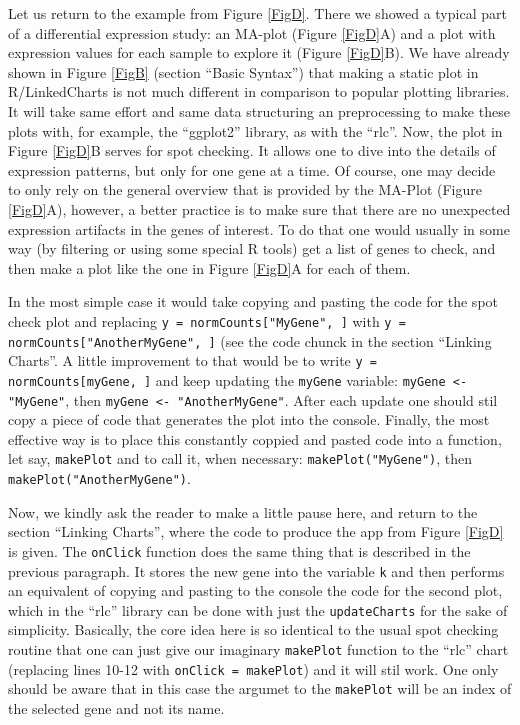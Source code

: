 \documentclass[twocolumn,10pt]{article}
\begin{document}
Let us return to the example from Figure \ref{FigD}. There we showed a typical part of a differential expression study: an MA-plot (Figure \ref{FigD}A) and a plot with expression values for each sample to explore it (Figure \ref{FigD}B). We have already shown in Figure \ref{FigB} (section ``Basic Syntax'') that making a static plot in R/LinkedCharts is not much different in comparison to popular plotting libraries. It will take same effort and same data structuring an preprocessing to make these plots with, for example, the ``ggplot2'' library, as with the ``rlc''. Now, the plot in Figure \ref{FigD}B serves for spot checking. It allows one to dive into the details of expression patterns, but only for one gene at a time. Of course, one may decide to only rely on the general overview that is provided by the MA-Plot (Figure \ref{FigD}A), however, a better practice is to make sure that there are no unexpected expression artifacts in the genes of interest. To do that one would usually in some way (by filtering or using some special R tools) get a list of genes to check, and then make a plot like the one in Figure \ref{FigD}A for each of them.

In the most simple case it would take copying and pasting the code for the spot check plot and replacing \texttt{y = normCounts["MyGene", ]} with \texttt{y = normCounts["AnotherMyGene", ]} (see the code chunck in the section ``Linking Charts''. A little improvement to that would be to write \texttt{y = normCounts[myGene, ]} and keep updating the \texttt{myGene} variable: \texttt{myGene <- "MyGene"}, then \texttt{myGene <- "AnotherMyGene"}. After each update one should stil copy a piece of code that generates the plot into the console. Finally, the most effective way is to place this constantly coppied and pasted code into a function, let say, \texttt{makePlot} and to call it, when necessary: \texttt{makePlot("MyGene")}, then \texttt{makePlot("AnotherMyGene")}.

Now, we kindly ask the reader to make a little pause here, and return to the section ``Linking Charts'', where the code to produce the app from Figure \ref{FigD} is given. The \texttt{onClick} function does the same thing that is described in the previous paragraph. It stores the new gene into the variable \texttt{k} and then performs an equivalent of copying and pasting to the console the code for the second plot, which in the ``rlc'' library can be done with just the \texttt{updateCharts} for the sake of simplicity. Basically, the core idea here is so identical to the usual spot checking routine that one can just give our imaginary \texttt{makePlot} function to the ``rlc'' chart (replacing lines 10-12 with \texttt{onClick = makePlot}) and it will stil work. One only should be aware that in this case the argumet to the \texttt{makePlot} will be an index of the selected gene and not its name.
\end{document}
